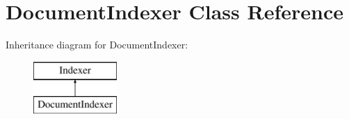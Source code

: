 \hypertarget{class_document_indexer}{}\section{Document\+Indexer Class Reference}
\label{class_document_indexer}
Inheritance diagram for Document\+Indexer\+:\begin{figure}[H]
\begin{center}
\leavevmode
\includegraphics[height=2.000000cm]{class_document_indexer}
\end{center}
\end{figure}
